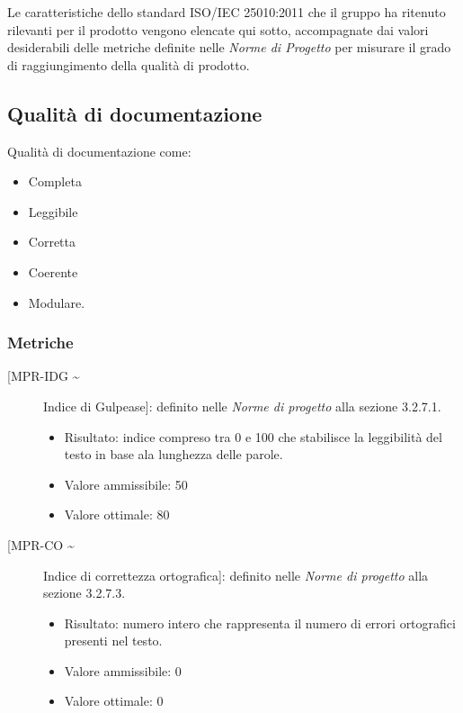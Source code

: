 \documentclass[../piano-di-qualifica.tex]{subfiles}
\begin{document}
Le caratteristiche dello standard ISO/IEC 25010:2011 che il gruppo ha ritenuto rilevanti per il prodotto vengono elencate qui sotto, accompagnate dai valori desiderabili delle metriche definite nelle \textit{Norme di Progetto} per misurare il grado di raggiungimento della qualità di prodotto.

\subsection{Qualità di documentazione}
Qualità di documentazione come:
\begin{itemize}
  \item Completa
  \item Leggibile
  \item Corretta
  \item Coerente
  \item Modulare.
\end{itemize}
\subsubsection{Metriche}%
\label{subsec:metriche_doc}

\begin{description}
  \item [[MPR-IDG \textasciitilde] Indice di Gulpease]: definito nelle \textit{Norme di progetto} alla sezione 3.2.7.1.
        \begin{itemize} \item Risultato: indice compreso tra 0 e 100 che stabilisce la leggibilità del testo in base ala lunghezza delle parole. \item Valore ammissibile: \geq{} 50 \item Valore ottimale: \geq{} 80 \end{itemize}
  \item [[MPR-CO \textasciitilde] Indice di correttezza ortografica]: definito nelle \textit{Norme di progetto} alla sezione 3.2.7.3.
        \begin{itemize} \item Risultato: numero intero che rappresenta il numero di errori ortografici presenti nel testo. \item Valore ammissibile: 0 \item Valore ottimale: 0 \end{itemize}
\end{description}
\end{document}

